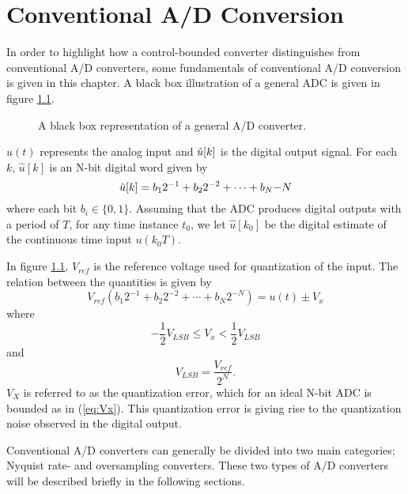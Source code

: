 
\chapter{Conventional A/D Conversion}
\label{sec:conventional_adc}
In order to highlight how a control-bounded converter distinguishes from conventional A/D converters, some fundamentals of conventional A/D conversion is given in this chapter. A black box illustration of a general ADC is given in figure \ref{fig:black_box_adc}.
\begin{figure}[htbp]
    \centering
    
    \caption{A black box representation of a general A/D converter.}
    \label{fig:black_box_adc}
\end{figure}
$u(t)$ represents the analog input and $\hat{u}[k]$ is the digital output signal. For each $k$, $\hat{u}[k]$ is an N-bit digital word given by
\begin{equation}
    \hat{u}[k] = b_1 2^{-1} + b_2 2^{-2} + \cdots + b_N{-N}
\end{equation}
where each bit $b_i \in \{0, 1\}$. Assuming that the ADC produces digital outputs with a period of $T$, for any time instance $t_0$, we let $\hat{u}[k_0]$ be the digital estimate of the continuous time input $u(k_0 T)$.

In figure \ref{fig:black_box_adc}, $V_{ref}$ is the reference voltage used for quantization of the input. The relation between the quantities is given by
\begin{equation}
    V_{ref}\left( b_1 2^{-1} + b_2 2^{-2} + \cdots + b_N 2^{-N}\right) = u(t) \pm V_x
\end{equation}
where
\begin{equation}
    \label{eq:Vx}
    -\frac{1}{2}V_{LSB} \leq V_x < \frac{1}{2}V_{LSB}
\end{equation}
and
\begin{equation}
    V_{LSB} = \frac{V_{ref}}{2^N}.
\end{equation}
$V_X$ is referred to as the quantization error, which for an ideal N-bit ADC is bounded as in (\ref{eq:Vx}). This quantization error is giving rise to the quantization noise observed in the digital output.

Conventional A/D converters can generally be divided into two main categories; Nyquist rate- and oversampling converters. These two types of A/D converters will be described briefly in the following sections.

